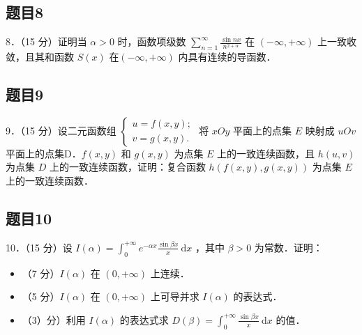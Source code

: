 \documentclass{article}
\begin{document}
\subsection{题目8}
8．（15 分）证明当 \(\alpha>0\) 时，函数项级数 \(\sum_{n=1}^{\infty} \frac{\sin n x}{n^{2+\alpha}}\) 在 \((-\infty,+\infty)\) 上一致收敛，且其和函数 \(S(x)\) 在\((-\infty,+\infty)\) 内具有连续的导函数．

\subsection{题目9}
9．（15 分）设二元函数组 \(\left\{\begin{array}{l}u=f(x, y) ; \\ v=g(x, y) .\end{array}\right.\) 将 \(x O y\) 平面上的点集 \(E\) 映射成 \(u O v\) 平面上的点集D．\(f(x, y)\) 和 \(g(x, y)\) 为点集 \(E\) 上的一致连续函数，且 \(h(u, v)\) 为点集 \(D\) 上的一致连续函数，证明：复合函数 \(h(f(x, y), g(x, y))\) 为点集 \(E\) 上的一致连续函数．

\subsection{题目10}
10．（15 分）设 \(I(\alpha)=\int_{0}^{+\infty} e^{-\alpha x} \frac{\sin \beta x}{x} \mathrm{~d} x\) ，其中 \(\beta>0\) 为常数．证明：

\begin{itemize}
  \item[（1）] （7 分）\(I(\alpha)\) 在 \((0,+\infty)\) 上连续．
  \item[（2）] （5 分）\(I(\alpha)\) 在 \((0,+\infty)\) 上可导并求 \(I(\alpha)\) 的表达式．
  \item[（3）] （3）分）利用 \(I(\alpha)\) 的表达式求 \(D(\beta)=\int_{0}^{+\infty} \frac{\sin \beta x}{x} \mathrm{~d} x\) 的值．
\end{itemize}
\end{document}
